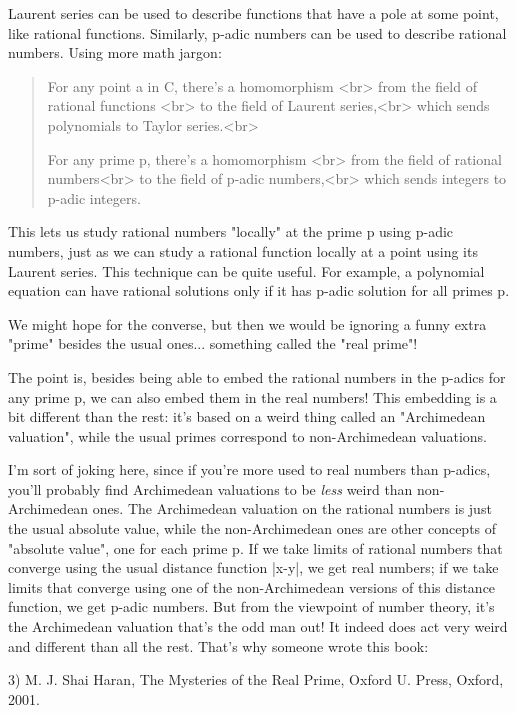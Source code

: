 Laurent series can be used to describe functions that have a pole at some
point, like rational functions.  Similarly, p-adic numbers can be used 
to describe rational numbers.  Using more math jargon:

\begin{quote}
   For any point a in C, there's a homomorphism  <br>
   from the field of rational functions <br>
   to the field of Laurent series,<br>
   which sends polynomials to Taylor series.<br>

   For any prime p, there's a homomorphism <br>
   from the field of rational numbers<br>
   to the field of p-adic numbers,<br>
   which sends integers to p-adic integers.
\end{quote}
    

This lets us study rational numbers "locally" at the prime p
using p-adic numbers, just as we can study a rational function locally
at a point using its Laurent series.  This technique can be quite
useful.  For example, a polynomial equation can have rational
solutions only if it has p-adic solution for all primes p.

We might hope for the converse, but then we would be ignoring a funny
extra "prime" besides the usual ones... something called the
"real prime"!

The point is, besides being able to embed the rational numbers in the
p-adics for any prime p, we can also embed them in the real numbers!
This embedding is a bit different than the rest: it's based on a weird
thing called an "Archimedean valuation", while the usual
primes correspond to non-Archimedean valuations.

I'm sort of joking here, since if you're more used to real numbers
than p-adics, you'll probably find Archimedean valuations to be \emph{less}
weird than non-Archimedean ones.  The Archimedean valuation on the
rational numbers is just the usual absolute value, while the
non-Archimedean ones are other concepts of "absolute value",
one for each prime p.  If we take limits of rational numbers that
converge using the usual distance function |x-y|, we get real numbers;
if we take limits that converge using one of the non-Archimedean
versions of this distance function, we get p-adic numbers.  But from
the viewpoint of number theory, it's the Archimedean valuation that's
the odd man out!  It indeed does act very weird and different than all
the rest.  That's why someone wrote this book:

3) M. J. Shai Haran, The Mysteries of the Real Prime, Oxford
U. Press, Oxford, 2001. 

